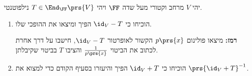 \documentclass[a4paper,10pt,twoside,openany]{article}
\begin{document}
\begin{exercise}
יהי
$V$
מרחב וקטורי מעל שדה
$\FF$
ויהי
$T \in \End_\FF\prs{V}$
נילפוטנטי.

\begin{enumerate}
\item הוכיחו כי
$\id_V - T$
הפיך ומיצאו את ההופכי שלו.

\textbf{רמז:}
מיצאו פולינום
$p\prs{x}$
הקשור לאופרטור $\id_V - T$, חישבו על דרך אחרת לכתוב את הביטוי
$\frac{1}{p\prs{x}}$
והציבו
$T$
בביטוי שקיבלתן.

\item הוכיחו כי
$\id_V + T$
הפיך והיעזרו בסעיף הקודם כדי למצוא את
$\prs{\id_V + T}^{-1}$.
\end{enumerate}
\end{exercise}
\end{document}
